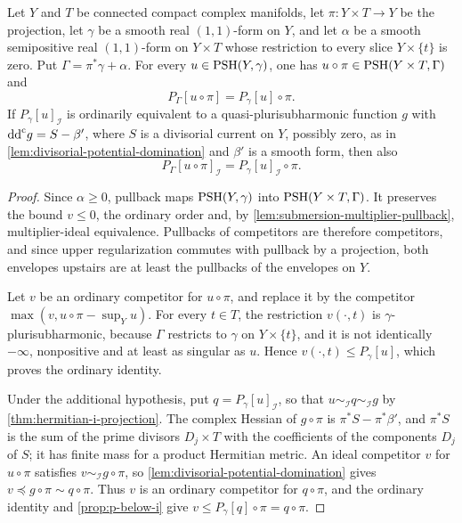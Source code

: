 \begin{lemma}\label{lem:auxiliary-slice-envelopes}
Let $Y$ and $T$ be connected compact complex manifolds, let $\pi\colon Y\times T\to Y$ be the projection, let $\gamma$ be a smooth real $(1,1)$-form on $Y$, and let $\alpha$ be a smooth semipositive real $(1,1)$-form on $Y\times T$ whose restriction to every slice $Y\times\{t\}$ is zero. Put $\Gamma=\pi^*\gamma+\alpha$. For every $u\in\mathrm{PSH}(Y,\gamma)$, one has $u\circ\pi\in\mathrm{PSH}(Y\times T,\Gamma)$ and
\[
 P_\Gamma[u\circ\pi]=P_\gamma[u]\circ\pi.
\]
If $P_\gamma[u]_{\mathcal I}$ is ordinarily equivalent to a quasi-plurisubharmonic function $g$ with $\mathrm{dd}^{\mathrm{c}} g=S-\beta'$, where $S$ is a divisorial current on $Y$, possibly zero, as in \cref{lem:divisorial-potential-domination} and $\beta'$ is a smooth form, then also
\[
 P_\Gamma[u\circ\pi]_{\mathcal I}=P_\gamma[u]_{\mathcal I}\circ\pi.
\]
\end{lemma}
\begin{proof}
Since $\alpha\geq0$, pullback maps $\mathrm{PSH}(Y,\gamma)$ into $\mathrm{PSH}(Y\times T,\Gamma)$. It preserves the bound $v\leq0$, the ordinary order and, by \cref{lem:submersion-multiplier-pullback}, multiplier-ideal equivalence. Pullbacks of competitors are therefore competitors, and since upper regularization commutes with pullback by a projection, both envelopes upstairs are at least the pullbacks of the envelopes on $Y$.

Let $v$ be an ordinary competitor for $u\circ\pi$, and replace it by the competitor $\max(v,u\circ\pi-\sup_Yu)$. For every $t\in T$, the restriction $v(\cdot,t)$ is $\gamma$-plurisubharmonic, because $\Gamma$ restricts to $\gamma$ on $Y\times\{t\}$, and it is not identically $-\infty$, nonpositive and at least as singular as $u$. Hence $v(\cdot,t)\leq P_\gamma[u]$, which proves the ordinary identity.

Under the additional hypothesis, put $q=P_\gamma[u]_{\mathcal I}$, so that $u\sim_{\mathcal I}q\sim_{\mathcal I}g$ by \cref{thm:hermitian-i-projection}. The complex Hessian of $g\circ\pi$ is $\pi^*S-\pi^*\beta'$, and $\pi^*S$ is the sum of the prime divisors $D_j\times T$ with the coefficients of the components $D_j$ of $S$; it has finite mass for a product Hermitian metric. An ideal competitor $v$ for $u\circ\pi$ satisfies $v\sim_{\mathcal I}g\circ\pi$, so \cref{lem:divisorial-potential-domination} gives $v\preceq g\circ\pi\sim q\circ\pi$. Thus $v$ is an ordinary competitor for $q\circ\pi$, and the ordinary identity and \cref{prop:p-below-i} give $v\leq P_\gamma[q]\circ\pi=q\circ\pi$.
\end{proof}

